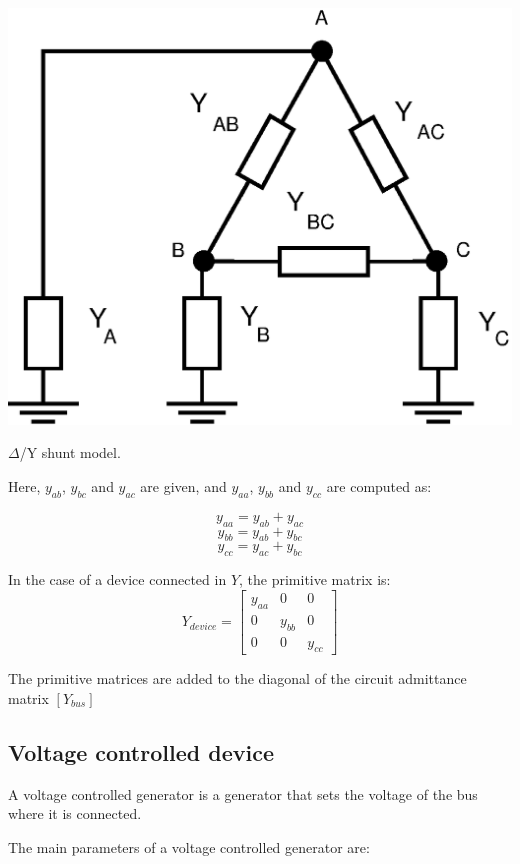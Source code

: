 \documentclass[nols,a4paper,twoside,symmetric,notoc,fleqn]{tufte-book}
\begin{document}
\begin{marginfigure}
	\includegraphics[width=0.99\linewidth]{img/DeltaShuntDevice.eps}
	\caption{$\Delta$/Y shunt model.}
	\label{delta_shunt_model}
\end{marginfigure}

Here, $y_{ab}$, $y_{bc}$ and $y_{ac}$ are given, and $y_{aa}$, $y_{bb}$ and $y_{cc}$ are computed as:

$$y_{aa} = y_{ab} + y_{ac}$$
$$y_{bb} = y_{ab} + y_{bc}$$
$$y_{cc} = y_{ac} + y_{bc}$$

In the case of a device connected in $Y$, the primitive matrix is:
\begin{equation}
Y_{device} = \left[ \begin{array}{ccc}
y_{aa} & 0 &  0 \\
0 & y_{bb} & 0 \\  
0 & 0 & y_{cc}
\end{array} \right] 
\end{equation}

The primitive matrices are added to the diagonal of the circuit admittance matrix $[Y_{bus}]$

\subsection{Voltage controlled device}

A voltage controlled generator is a generator that sets the voltage of the bus where it is connected.

The main parameters of a voltage controlled generator are:\\
\end{document}
